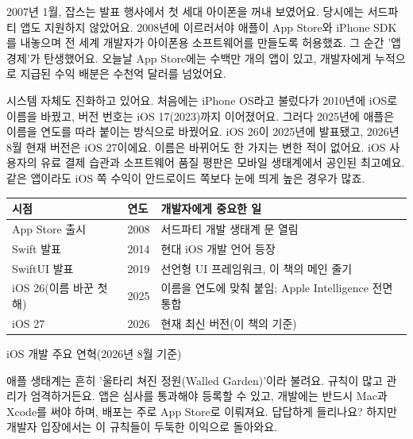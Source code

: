 


2007년 1월, 잡스는 발표 행사에서 첫 세대 아이폰을 꺼내 보였어요. 당시에는 서드파티 앱도 지원하지 않았어요. 2008년에 이르러서야 애플이 App Store와 iPhone SDK를 내놓으며 전 세계 개발자가 아이폰용 소프트웨어를 만들도록 허용했죠. 그 순간 '앱 경제'가 탄생했어요. 오늘날 App Store에는 수백만 개의 앱이 있고, 개발자에게 누적으로 지급된 수익 배분은 수천억 달러를 넘었어요.

시스템 자체도 진화하고 있어요. 처음에는 iPhone OS라고 불렀다가 2010년에 iOS로 이름을 바꿨고, 버전 번호는 iOS 17(2023)까지 이어졌어요. 그러다 2025년에 애플은 이름을 연도를 따라 붙이는 방식으로 바꿨어요. iOS 26이 2025년에 발표됐고, 2026년 8월 현재 버전은 iOS 27이에요. 이름은 바뀌어도 한 가지는 변한 적이 없어요. iOS 사용자의 유료 결제 습관과 소프트웨어 품질 평판은 모바일 생태계에서 공인된 최고예요. 같은 앱이라도 iOS 쪽 수익이 안드로이드 쪽보다 눈에 띄게 높은 경우가 많죠.

\begin{center}
\begin{tabularx}{\linewidth}{|X|X|X|}
\hline
\textbf{시점} & \textbf{연도} & \textbf{개발자에게 중요한 일} \tabularnewline
\hline
App Store 출시 & 2008 & 서드파티 개발 생태계 문 열림 \tabularnewline
Swift 발표 & 2014 & 현대 iOS 개발 언어 등장 \tabularnewline
SwiftUI 발표 & 2019 & 선언형 UI 프레임워크, 이 책의 메인 줄기 \tabularnewline
iOS 26(이름 바꾼 첫해) & 2025 & 이름을 연도에 맞춰 붙임; Apple Intelligence 전면 통합 \tabularnewline
iOS 27 & 2026 & 현재 최신 버전(이 책의 기준) \tabularnewline
\hline
\end{tabularx}
\end{center}

\begin{center}\small\color{gray}iOS 개발 주요 연혁(2026년 8월 기준)\end{center}


애플 생태계는 흔히 '울타리 쳐진 정원(Walled Garden)'이라 불려요. 규칙이 많고 관리가 엄격하거든요. 앱은 심사를 통과해야 등록할 수 있고, 개발에는 반드시 Mac과 Xcode를 써야 하며, 배포는 주로 App Store로 이뤄져요. 답답하게 들리나요? 하지만 개발자 입장에서는 이 규칙들이 두둑한 이익으로 돌아와요.

